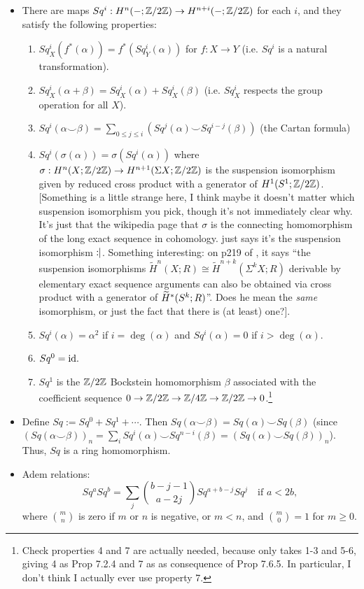\documentclass{MetricNotes2023}
\def\inte{\ensuremath\mathbb{Z}}
\def\id{\ensuremath\text{id}}
\def\wildetilde{\ensuremath\widetilde}
\begin{document}
\begin{itemize}
\item There are maps \(Sq^i : H^n(-; \inte/2\inte)\to H^{n+i}(- ; \inte/2\inte)\) for each \(i\), and they satisfy the following properties: \begin{enumerate}
\item \(Sq^i_X(f^*(\alpha))=f^*(Sq^i_Y(\alpha))\) for \(f : X \to Y\) (i.e. \(Sq^i\) is a natural transformation).
\item \(Sq^i_X(\alpha + \beta)=Sq^i_X(\alpha)+Sq^i_X(\beta)\) (i.e. \(Sq_X^i\) respects the group operation for all \(X\)).
\item \(Sq^i(\alpha \smile \beta)=\sum\limits_{0\leq j \leq i} (Sq^j(\alpha)\smile Sq^{i-j}(\beta))\) (the Cartan formula)
\item \(Sq^i(\sigma(\alpha))=\sigma(Sq^i(\alpha))\) where \(\sigma : H^n(X; \inte/2\inte)\to H^{n+1}(\Sigma X; \inte/2\inte)\) is the suspension isomorphism given by reduced cross product with a generator of \(H^1(S^1; \inte/2\inte)\). [Something is a little strange here, I think maybe it doesn't matter which suspension isomorphism you pick, though it's not immediately clear why. It's just that the wikipedia page that \(\sigma\) is the connecting homomorphism of the long exact sequence in cohomology. \autocite{rognes2} just says it's the suspension isomorphism \(:\hspace{-0.75ex}|\). Something interesting: on p219 of \autocite{hatcher}, it says ``the suspension isomorphisms \(\widetilde H^n(X;R)\cong \widetilde H^{n+k}(\Sigma^kX;R)\) derivable by elementary exact sequence arguments can also be obtained via cross product with a generator of \(\wildetilde H^*(S^k; R)\)''. Does he mean the \textit{same} isomorphism, or just the fact that there is (at least) one?].
\item \(Sq^i(\alpha)=\alpha^2\) if \(i=\deg(\alpha)\) and \(Sq^i(\alpha)=0\) if \(i> \deg(\alpha)\). 
\item \(Sq^0=\id.\)
\item \(Sq^1\) is the \(\inte/2\inte\) Bockstein homomorphism \(\beta\) associated with the coefficient sequence \(0 \to \inte/2\inte \to \inte/4\inte \to \inte/2\inte \to 0\).\footnote{Check properties 4 and 7 are actually needed, because \autocite{rognes2} only takes 1-3 and 5-6, giving 4 as Prop 7.2.4 and 7 as as consequence of Prop 7.6.5. In particular, I don't think I actually ever use property 7.}
\end{enumerate}
\item Define \(Sq:=Sq^0+Sq^1+\cdots\). Then \(Sq(\alpha\smile \beta)=Sq(\alpha)\smile Sq(\beta)\) (since \((Sq(\alpha\smile \beta))_n=\sum_iSq^i(\alpha)\smile Sq^{n-i}(\beta)=(Sq(\alpha)\smile Sq(\beta))_n\)). Thus, \(Sq\) is a ring homomorphism. 
\item Adem relations:
\[Sq^aSq^b=\sum_j {b-j-1\choose a-2j}Sq^{a+b-j}Sq^j \quad \text{if } a<2b,\]
where \({m \choose n}\) is zero if \(m\) or \(n\) is negative, or \(m<n\), and \({m \choose 0}=1\) for \(m \geq 0\).
\end{itemize}
\end{document}
